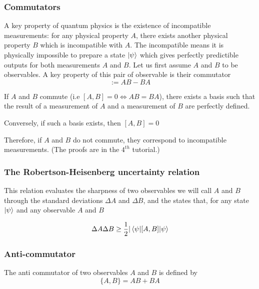 \documentclass{article}
\begin{document}
\subsubsection{Commutators}
A key property of quantum physics is the existence of incompatible measurements:
for any physical property $A$, there exists another physical property $B$ which is incompatible
with $A$. The incompatible means it is physically impossible to prepare a state $\ket{\psi}$
which gives perfectly predictible outputs for both measurements $A$ and $B$.
Let us first assume $A$ and $B$ to be observables.
A key property of this pair of observable is their commutator
\begin{equation}
    [A,B]:= AB-BA
\end{equation}

If $A$ and $B$ commute (i.e $[A,B]=0 \Leftrightarrow AB = BA$), there exists a basis
such that the result of a measurement of $A$ and a measurement of $B$ are perfectly defined.

Conversely, if such a basis exists, then $[A,B]=0$

Therefore, if $A$ and $B$ do not commute, they correspond to incompatible measurements.
(The proofs are in the $4^{th}$ tutorial.)

\subsubsection{The Robertson-Heisenberg uncertainty relation}
This relation evaluates the sharpness of two observables we will call $A$ and $B$ through
the standard deviations $\Delta A$ and $\Delta B$, and the states that, for any state $\ket{\psi}$
and any observable $A$ and $B$

\begin{equation}
    \Delta A \Delta B \geq \frac{1}{2}|\braket{\psi|[A,B]|\psi}
\end{equation}

\subsubsection{Anti-commutator}
The anti commutator of two observables $A$ and $B$ is defined by
\begin{equation}
    \{A,B\} = AB+BA
\end{equation}
\end{document}
